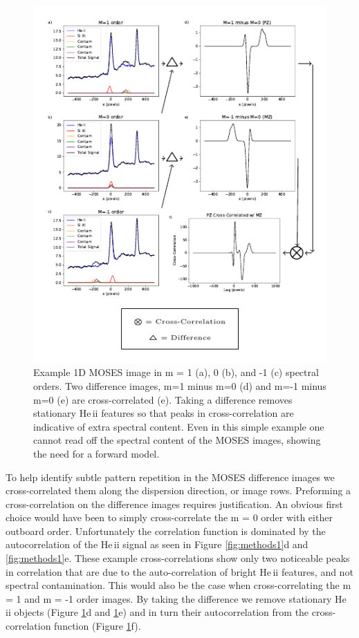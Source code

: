 \documentclass[]{solarphysics}
\begin{document}
\begin{article}
 	 	\begin{figure}
 	 		\includegraphics[scale = 1.5]{methods_fig_2.pdf}
 	 		\caption{Example 1D MOSES image in m = 1 (a), 0 (b), and -1 (c) spectral orders.  Two difference images, m=1 minus m=0 (d) and m=-1 minus m=0 (e) are cross-correlated (e).  Taking a difference removes stationary He\,{\sc ii} features so that peaks in cross-correlation are indicative of extra spectral content.  Even in this simple example one cannot read off the spectral content of the MOSES images, showing the need for a forward model.}
 	 		\label{fig:methods2}
 	 	\end{figure}
	
 	To help identify subtle pattern repetition in the MOSES difference images we cross-correlated them along the dispersion direction, or image rows.   Preforming a cross-correlation on the difference images requires justification.  An obvious first choice would have been to simply cross-correlate the m = 0 order with either outboard order.  Unfortunately the correlation function is dominated by the autocorrelation of the He\,{\sc ii} signal as seen in Figure \ref{fig:methods1}d and \ref{fig:methods1}e.  These example cross-correlations show only two noticeable peaks in correlation that are due to the auto-correlation of bright He\,{\sc ii} features, and not spectral contamination.  This would also be the case when cross-correlating the m = 1 and m = -1 order images.  By taking the difference we remove stationary He {\sc ii} objects (Figure \ref{fig:methods2}d and \ref{fig:methods2}e) and in turn their autocorrelation from the cross-correlation function (Figure \ref{fig:methods2}f).
 	

\end{article}
\end{document}
